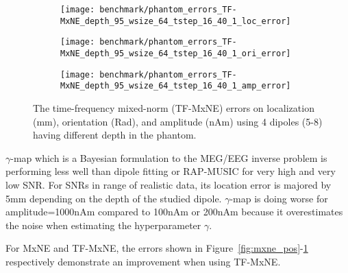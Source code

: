 \begin{sidewaysfigure}[ht]
        \centering
        \begin{subfigure}[b]{0.28\textwidth}
            \centering
            \texttt{[image: benchmark/phantom\_errors\_TF-MxNE\_depth\_95\_wsize\_64\_tstep\_16\_40\_1\_loc\_error]}
            \caption{\label{fig:tfmxne_pos}}
        \end{subfigure}
		\hspace{35pt}
        \begin{subfigure}[b]{0.28\textwidth}  
            \centering 
            \texttt{[image: benchmark/phantom\_errors\_TF-MxNE\_depth\_95\_wsize\_64\_tstep\_16\_40\_1\_ori\_error]}
            \caption{\label{fig:tfmxne_ori}}
        \end{subfigure}
		\hspace{35pt}
        \begin{subfigure}[b]{0.28\textwidth}   
            \centering 
            \texttt{[image: benchmark/phantom\_errors\_TF-MxNE\_depth\_95\_wsize\_64\_tstep\_16\_40\_1\_amp\_error]}
            \caption{\label{fig:tfmxne_amp}}
        \end{subfigure}

		\caption{The time-frequency mixed-norm (TF-MxNE) errors on localization (mm), orientation (Rad), and amplitude (nAm) using 4 dipoles (5-8) having different depth in the phantom.\label{fig:tfmxne_errors}}
\end{sidewaysfigure}

$\gamma$-map which is a Bayesian formulation to the MEG/EEG inverse problem is performing less well than dipole fitting or RAP-MUSIC for very high and very low SNR. For SNRs in range of realistic data, its location error is majored by 5mm depending on the depth of the studied dipole. $\gamma$-map is doing worse for amplitude=1000nAm compared to 100nAm or 200nAm because it overestimates the noise when estimating the hyperparameter $\gamma$.

For MxNE and TF-MxNE, the errors shown in Figure~\ref{fig:mxne_pos}-\ref{fig:tfmxne_pos} respectively demonstrate an improvement when using TF-MxNE.

